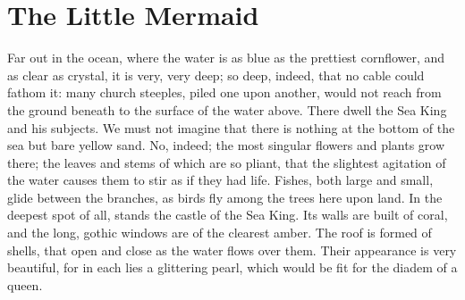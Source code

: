 \chapter{The Little Mermaid}


Far out in the ocean, where the water is as blue as the
prettiest cornflower, and as clear as crystal, it is very, very
deep; so deep, indeed, that no cable could fathom it: many church
steeples, piled one upon another, would not reach from the ground
beneath to the surface of the water above. 
There dwell the Sea King
and his subjects. 
We must not imagine that there is nothing at the
bottom of the sea but bare yellow sand. 
No, indeed; the most
singular flowers and plants grow there; the leaves and stems of
which are so pliant, that the slightest agitation of the water
causes them to stir as if they had life. 
Fishes, both large and small,
glide between the branches, as birds fly among the trees here upon
land. 
In the deepest spot of all, stands the castle of the Sea King.
Its walls are built of coral, and the long, gothic windows are of
the clearest amber. 
The roof is formed of shells, that open and
close as the water flows over them. 
Their appearance is very
beautiful, for in each lies a glittering pearl, which would be fit for
the diadem of a queen.

